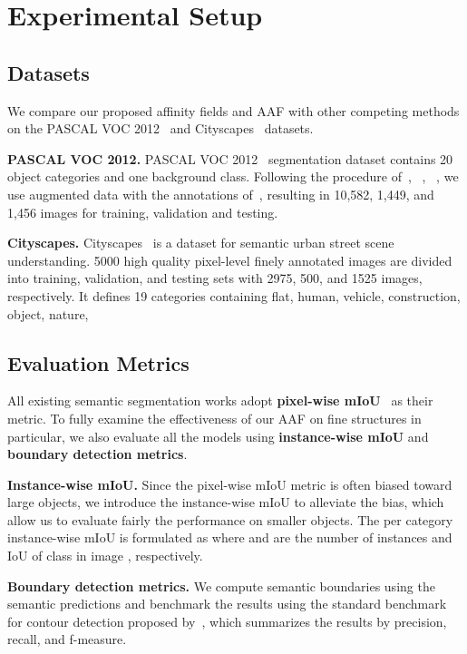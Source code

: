 \section{Experimental Setup}
\label{sec:exp_setup}

\subsection{Datasets}
\label{subsec:datasets}
We compare our proposed affinity fields and AAF with other competing methods on the PASCAL VOC 2012~\cite{everingham2010pascal} and Cityscapes~\cite{Cordts2016Cityscapes} datasets.

\noindent
\textbf{PASCAL VOC 2012.}
\label{sec:voc}
PASCAL VOC 2012~\cite{everingham2010pascal} segmentation dataset contains 20 object categories and one background class. Following the procedure of~\cite{long2015fully}, ~\cite{zhao2016pyramid}, ~\cite{chen2016deeplab}, we use augmented data with the annotations of~\cite{hariharan2011semantic}, resulting in 10,582, 1,449, and 1,456 images for training, validation and testing. 

\noindent
\textbf{Cityscapes.}
\label{sec:cityscapes}
Cityscapes~\cite{Cordts2016Cityscapes} is a dataset for semantic urban street scene understanding.  5000 high quality
pixel-level finely annotated images are divided into  training, validation, and testing sets with 2975, 500, and 1525 images, respectively. It defines 19 categories containing flat, human, vehicle, construction, object, nature, \etc

\subsection{Evaluation Metrics}
\label{subsec:metrics}
All existing semantic segmentation works adopt \textbf{pixel-wise mIoU}~\cite{long2015fully} as their metric.  To fully examine the effectiveness of our AAF on fine structures in particular, we also evaluate all the models using \textbf{instance-wise mIoU} and \textbf{boundary detection metrics}.

\noindent
\textbf{Instance-wise mIoU.}
Since the pixel-wise mIoU metric is often biased toward large objects, we introduce the instance-wise mIoU to alleviate the bias, which allow us to evaluate fairly the performance on smaller objects. The per category instance-wise mIoU is formulated as 
where  and  are the number of instances and IoU of class  in image , respectively. 

\noindent
\textbf{Boundary detection metrics.}
We compute semantic boundaries using the semantic predictions and benchmark the results using the standard benchmark for contour detection proposed by~\cite{amfm_pami2011}, which summarizes the results by precision, recall, and f-measure. 

